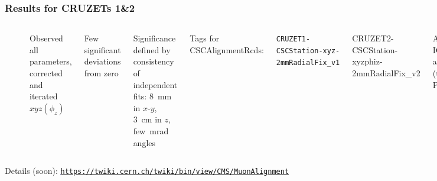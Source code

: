 \documentclass[compress]{beamer}
\begin{document}
\begin{frame}
\frametitle{Results for CRUZETs 1\&2}
\small

\begin{columns}
\includegraphics[height=3 cm]{cruzet1_results.png}

\vspace{0.5 cm}
\includegraphics[height=3.3 cm]{cruzet2_results.png}


\vspace{0.35 cm}
Observed all parameters, corrected and iterated \mbox{$xyz(\phi_z)$\hspace{-0.5 cm}}

\vspace{0.35 cm}
Few significant deviations from zero

\vspace{0.35 cm}
Significance defined by consistency of independent fits: 8~mm in $x$-$y$, 3~cm in $z$, few~mrad angles

\vspace{0.35 cm}
Tags for CSCAlignmentRcds:

\vspace{0.1 cm}
{\tt \tiny CRUZET1-CSCStation-xyz-2mmRadialFix\_v1

CRUZET2-CSCStation-xyzphiz-2mmRadialFix\_v2}

\vspace{0.35 cm}
Appropriate IOVs applied (thanks, Pablo!)
\end{columns}

\vspace{0.4 cm}
Details (soon): \textcolor{blue}{\tt \scriptsize \underline{\href{https://twiki.cern.ch/twiki/bin/view/CMS/MuonAlignment}{https://twiki.cern.ch/twiki/bin/view/CMS/MuonAlignment}}}
\end{frame}
\end{document}
